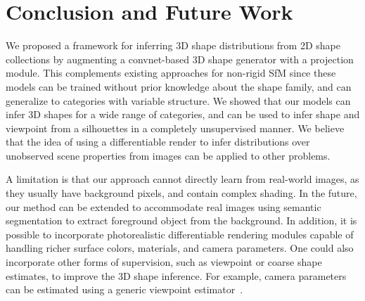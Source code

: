 \section{Conclusion and Future Work}\label{s:conclusion}
We proposed a framework for inferring 3D shape distributions from 2D
shape collections by augmenting a convnet-based 3D shape generator
with a projection module. 
This complements existing approaches for
non-rigid SfM since these models can be trained without prior
knowledge about the shape family, and can generalize to categories
with variable structure.
We showed that our models can infer 3D shapes
for a wide range of categories, and can be used to infer shape and
viewpoint from a silhouettes in a completely unsupervised manner.
We believe that the idea of using a differentiable render to infer
distributions over unobserved scene properties from images can be
applied to other problems.

A limitation is that our approach cannot directly learn
from real-world images, as they usually have background pixels, and
contain complex shading.
In the future, our method can be extended to accommodate real images
using semantic segmentation to extract foreground object from the
background.
In addition, it is possible to incorporate photorealistic
differentiable rendering modules capable of handling richer surface
colors, materials, and camera parameters.
One could also incorporate other forms of supervision, such as
viewpoint or coarse shape estimates, to improve the 3D shape
inference.
For example, camera parameters can be estimated using a generic
viewpoint estimator~\cite{tulsiani2015pose,su2015render}.


